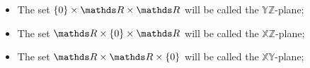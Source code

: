 \begin{df}
	\begin{itemize}
		\item The set $\{0\}\times \R\times \R$ will be called the $\mathds{YZ}$-plane;
		\item The set $\R\times\{0\}\times \R$ will be called the $\mathds{XZ}$-plane;
		\item The set $\R\times \R\times \{0\}$ will be called the $\mathds{XY}$-plane;		
	\end{itemize}
\end{df}